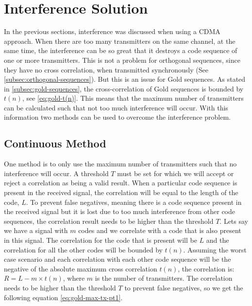 
\section{Interference Solution}
\label{sec:interference-solution}

In the previous sections, interference was discussed when using a CDMA approach.
When there are too many transmitters on the same channel, at the same time, the interference can be so great that it destroys a code sequence of one or more transmitters.
This is not a problem for orthogonal sequences, since they have no cross correlation, when transmitted synchronously (See \autoref{subsec:orthogonal-sequences}).
But this is an issue for Gold sequences. 
As stated in \autoref{subsec:gold-sequences}, the cross-correlation of Gold sequences is bounded by $t(n)$, see \autoref{eq:gold-t(n)}.
This means that the maximum number of transmitters can be calculated such that not too much interference will occur. 
With this information two methods can be used to overcome the interference problem.



\subsection{Continuous Method}
\label{subsec:continuous-method-modulation}


One method is to only use the maximum number of transmitters such that no interference will occur.
A threshold $T$ must be set for which we will accept or reject a correlation as being a valid result.
When a particular code sequence is present in the received signal, the correlation will be equal to the length of the code, $L$.
To prevent false negatives, meaning there is a code sequence present in the received signal but it is lost due to too much interference from other code sequences, the correlation result needs to be higher than the threshold $T$.
Lets say we have a signal with $m$ codes and we correlate with a code that is also present in this signal.
The correlation for the code that is present will be $L$ and the correlation for all the other codes will be bounded by $t(n)$.
Assuming the worst case scenario and each correlation with each other code sequence will be the negative of the absolute maximum cross correlation $t(n)$, the correlation is: $R = L - m \times t(n)$, where $m$ is the number of transmitters.
The correlation needs to be higher than the threshold $T$ to prevent false negatives, so we get the following equation \autoref{eq:gold-max-tx-pt1}.

